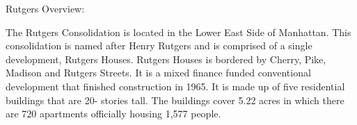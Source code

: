 Rutgers Overview:    

  

The Rutgers Consolidation is located in the Lower East Side of Manhattan. This consolidation is named after Henry Rutgers and is comprised of a single development, Rutgers Houses. Rutgers Houses is bordered by Cherry, Pike, Madison and Rutgers Streets. It is a mixed finance funded conventional development that finished construction in 1965. It is made up of five residential buildings that are 20- stories tall. The buildings cover 5.22 acres in which there are 720 apartments officially housing 1,577 people.